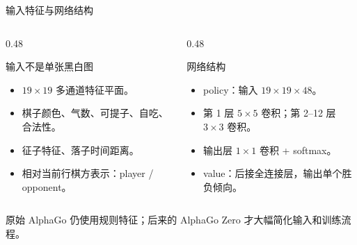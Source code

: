 \documentclass[UTF8,aspectratio=169,10pt]{ctexbeamer}
\begin{document}
\begin{frame}{输入特征与网络结构}
  \begin{columns}[T,onlytextwidth]
    \begin{column}{0.48\textwidth}
      \begin{block}{输入不是单张黑白图}
        \begin{itemize}
          \item $19\times19$ 多通道特征平面。
          \item 棋子颜色、气数、可提子、自吃、合法性。
          \item 征子特征、落子时间距离。
          \item 相对当前行棋方表示：player / opponent。
        \end{itemize}
      \end{block}
    \end{column}
    \begin{column}{0.48\textwidth}
      \begin{block}{网络结构}
        \begin{itemize}
          \item policy：输入 $19\times19\times48$。
          \item 第 1 层 $5\times5$ 卷积；第 2--12 层 $3\times3$ 卷积。
          \item 输出层 $1\times1$ 卷积 + softmax。
          \item value：后接全连接层，输出单个胜负倾向。
        \end{itemize}
      \end{block}
    \end{column}
  \end{columns}

  \vspace{0.14cm}
  \begin{center}
    \small
    原始 AlphaGo 仍使用规则特征；后来的 AlphaGo Zero 才大幅简化输入和训练流程。
  \end{center}
\end{frame}
\end{document}
